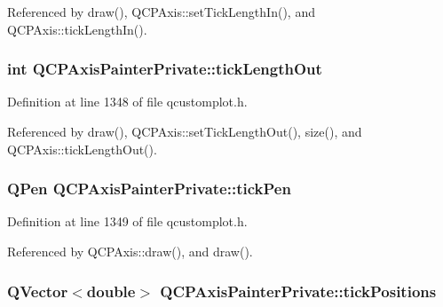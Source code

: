 Referenced by draw(), Q\+C\+P\+Axis\+::set\+Tick\+Length\+In(), and Q\+C\+P\+Axis\+::tick\+Length\+In().

\hypertarget{class_q_c_p_axis_painter_private_acbebb1f868906200f968627bc907b77d}{}
\subsubsection[{tick\+Length\+Out}]{\setlength{\rightskip}{0pt plus 5cm}int Q\+C\+P\+Axis\+Painter\+Private\+::tick\+Length\+Out}\label{class_q_c_p_axis_painter_private_acbebb1f868906200f968627bc907b77d}


Definition at line 1348 of file qcustomplot.\+h.



Referenced by draw(), Q\+C\+P\+Axis\+::set\+Tick\+Length\+Out(), size(), and Q\+C\+P\+Axis\+::tick\+Length\+Out().

\hypertarget{class_q_c_p_axis_painter_private_a389dde97f02fdee23965e4736e7d8c62}{}
\subsubsection[{tick\+Pen}]{\setlength{\rightskip}{0pt plus 5cm}Q\+Pen Q\+C\+P\+Axis\+Painter\+Private\+::tick\+Pen}\label{class_q_c_p_axis_painter_private_a389dde97f02fdee23965e4736e7d8c62}


Definition at line 1349 of file qcustomplot.\+h.



Referenced by Q\+C\+P\+Axis\+::draw(), and draw().

\hypertarget{class_q_c_p_axis_painter_private_ae55e3dc2cf2af8d8a6e7235ccab54786}{}
\subsubsection[{tick\+Positions}]{\setlength{\rightskip}{0pt plus 5cm}Q\+Vector$<$double$>$ Q\+C\+P\+Axis\+Painter\+Private\+::tick\+Positions}\label{class_q_c_p_axis_painter_private_ae55e3dc2cf2af8d8a6e7235ccab54786}


